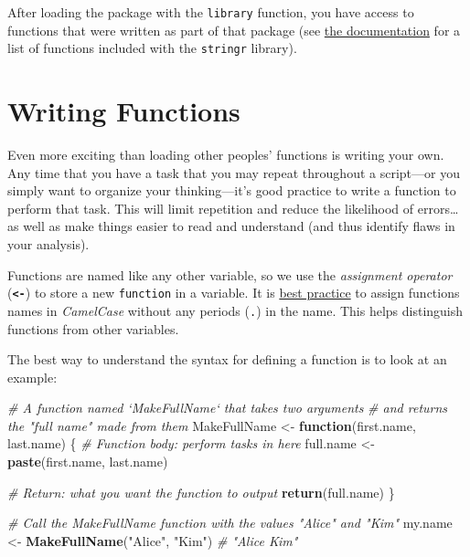 \documentclass[]{book}
\newenvironment{Shaded}{\begin{snugshade}}{\end{snugshade}}
\newcommand{\KeywordTok}[1]{\textcolor[rgb]{0.13,0.29,0.53}{\textbf{#1}}}
\newcommand{\StringTok}[1]{\textcolor[rgb]{0.31,0.60,0.02}{#1}}
\newcommand{\CommentTok}[1]{\textcolor[rgb]{0.56,0.35,0.01}{\textit{#1}}}
\newcommand{\ControlFlowTok}[1]{\textcolor[rgb]{0.13,0.29,0.53}{\textbf{#1}}}
\newcommand{\NormalTok}[1]{#1}
\theoremstyle{definition}
\theoremstyle{definition}
\theoremstyle{remark}
\begin{document}
After loading the package with the \texttt{library} function, you have
access to functions that were written as part of that package (see
\href{https://cran.r-project.org/web/packages/stringr/stringr.pdf}{the
documentation} for a list of functions included with the
\texttt{stringr} library).

\section{Writing Functions}\label{writing-functions}

Even more exciting than loading other peoples' functions is writing your
own. Any time that you have a task that you may repeat throughout a
script---or you simply want to organize your thinking---it's good
practice to write a function to perform that task. This will limit
repetition and reduce the likelihood of errors\ldots{} as well as make
things easier to read and understand (and thus identify flaws in your
analysis).

Functions are named like any other variable, so we use the
\emph{assignment operator} (\textbf{\texttt{\textless{}-}}) to store a
new \texttt{function} in a variable. It is
\href{https://google.github.io/styleguide/Rguide.xml\#functiondefinition}{best
practice} to assign functions names in \emph{CamelCase} without any
periods (\texttt{.}) in the name. This helps distinguish functions from
other variables.

The best way to understand the syntax for defining a function is to look
at an example:

\begin{Shaded}
\begin{Highlighting}[]
\CommentTok{# A function named `MakeFullName` that takes two arguments}
\CommentTok{# and returns the "full name" made from them}
\NormalTok{MakeFullName <-}\StringTok{ }\ControlFlowTok{function}\NormalTok{(first.name, last.name) \{}
  \CommentTok{# Function body: perform tasks in here}
\NormalTok{  full.name <-}\StringTok{ }\KeywordTok{paste}\NormalTok{(first.name, last.name)}

  \CommentTok{# Return: what you want the function to output}
  \KeywordTok{return}\NormalTok{(full.name)}
\NormalTok{\}}

\CommentTok{# Call the MakeFullName function with the values "Alice" and "Kim"}
\NormalTok{my.name <-}\StringTok{ }\KeywordTok{MakeFullName}\NormalTok{(}\StringTok{"Alice"}\NormalTok{, }\StringTok{"Kim"}\NormalTok{)  }\CommentTok{# "Alice Kim"}
\end{Highlighting}
\end{Shaded}
\end{document}
